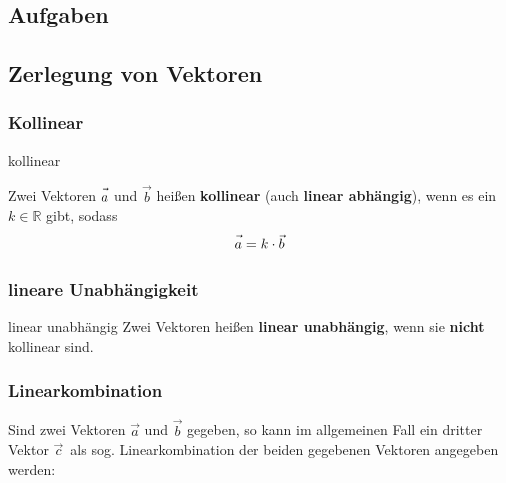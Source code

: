
\subsection*{Aufgaben}
\newpage


\subsection{Zerlegung von Vektoren}

\subsubsection{Kollinear}

\begin{definition}{kollinear}{}\label{linearkombination}

  Zwei Vektoren $\vec{a\vphantom{b}}$ und $\vec{b}$ heißen
  \textbf{kollinear} (auch \textbf{linear abhängig}), wenn es ein
  $k\in\mathbb{R}$ gibt, sodass
  $$\vec{a\vphantom{b}} = k\cdot{}\vec{b}$$
\end{definition}

\subsubsection{lineare Unabhängigkeit}
\begin{definition}{linear unabhängig}{}
Zwei Vektoren heißen \textbf{linear unabhängig}, wenn sie \textbf{nicht}
kollinear sind.
\end{definition}

\subsubsection{Linearkombination}
Sind zwei Vektoren $\vec{a}$ und $\vec{b}$ gegeben, so kann im
allgemeinen Fall ein
dritter Vektor $\vec{c}$\, als sog. Linearkombination der beiden
gegebenen Vektoren angegeben werden:

